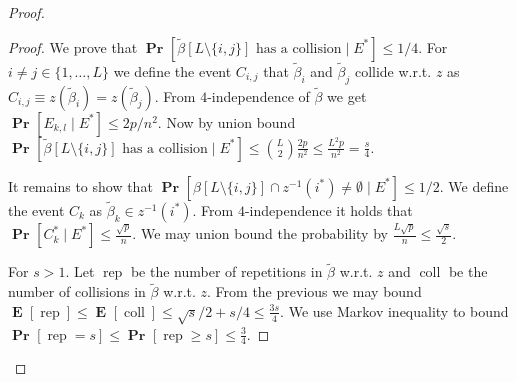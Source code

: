 \documentclass{article}
\newcommand{\probs}[2]{\operatorname{\mathbf{Pr}}_{{#1}}\left[{#2}\right]}
\newcommand{\prob}[1]{\probs{}{#1}}
\newcommand{\expects}[2]{\operatorname{\mathbf{E}}_{{#1}}\left[{#2}\right]}
\newcommand{\expect}[1]{\expects{}{#1}}
\begin{document}
\begin{proof}
\begin{proof}
We prove that $\prob{\tilde \beta[L \setminus \{i, j\}] \mbox{ has a collision} \mid E^{*}} \leq 1/4.$
For $i \neq j \in \{1, \dots, L\}$ we define the event $C_{i, j}$ that $\tilde \beta_i$ and $\tilde \beta_j$ collide w.r.t. $z$ as $C_{i, j} \equiv z(\tilde \beta_i) = z(\tilde \beta_j)$.
From $4$-independence of $\tilde \beta$ we get $\prob{E_{k, l} \mid E^{*}} \leq 2p/n^2$.
Now by union bound $\prob{\tilde \beta[L \setminus \{i, j\}] \mbox{ has a collision} \mid E^{*}} \leq \binom{L}{2}\frac{2p}{n^2} \leq \frac{L^2p}{n^2} = \frac{s}{4}$.

It remains to show that $\prob{\beta[L \setminus \{i, j\}] \cap z^{-1}(i^{*}) \neq \emptyset \mid E^{*}} \leq 1/2.$ We define the event $C_k$ as $\tilde \beta_k \in z^{-1}(i^{*})$. From $4$-independence it holds that $\prob{C^{*}_k \mid E^{*}} \leq \frac{\sqrt{p}}{n}$. We may union bound the probability by $\frac{L\sqrt{p}}{n} \leq \frac{\sqrt{s}}{2}$.

For $s > 1$. Let $\operatorname{rep}$ be the number of repetitions in $\tilde \beta$ w.r.t. $z$ and $\operatorname{coll}$ be the number of collisions in $\tilde \beta$ w.r.t. $z$. 
From the previous we may bound $\expect{\operatorname{rep}} \leq \expect{\operatorname{coll}} \leq \sqrt{s}/2 + s/4 \leq \frac{3s}{4}.$
We use Markov inequality to bound $\prob{\operatorname{rep} = s} \leq \prob{\operatorname{rep} \geq s} \leq \frac{3}{4}.$ 
\end{proof}

\end{proof}
\end{document}
